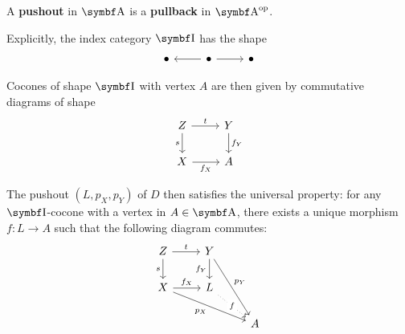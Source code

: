 \begin{definition}\label{def:categorical_pushout}\cite[definition 5.2.11]{Leinster2014}
  A \textbf{pushout} in \( \Bold A \) is a \textbf{pullback} in \( \Bold A^{\Op} \).

  Explicitly, the index category \( \Bold I \) has the shape
  \begin{equation*}
    \begin{tikzcd}
      \bullet & \bullet \arrow[l] \arrow[r] & \bullet
    \end{tikzcd}
  \end{equation*}

  Cocones of shape \( \Bold I \) with vertex \( A \) are then given by commutative diagrams of shape
  \begin{equation*}
    \begin{tikzcd}
      Z \arrow[r, "t"] \arrow[d, "s"'] & Y \arrow[d, "f_Y"] \\
      X \arrow[r, "f_X"']              & A
    \end{tikzcd}
  \end{equation*}

  The pushout \( (L, p_X, p_Y) \) of \( D \) then satisfies the universal property: for any \( \Bold I \)-cocone with a vertex in \( A \in \Bold A \), there exists a unique morphism \( f: L \to A \) such that the following diagram commutes:
  \begin{equation*}
    \begin{tikzcd}
      Z \arrow[r, "t"] \arrow[d, "s"']       & Y \arrow[d, "f_Y"'] \arrow[rdd, "p_Y"] & \\
      X \arrow[r, "f_X"] \arrow[rrd, "p_X"'] & L \arrow[rd, "f" description, dotted]  & \\
                                             &                                        & A
    \end{tikzcd}
  \end{equation*}
\end{definition}

